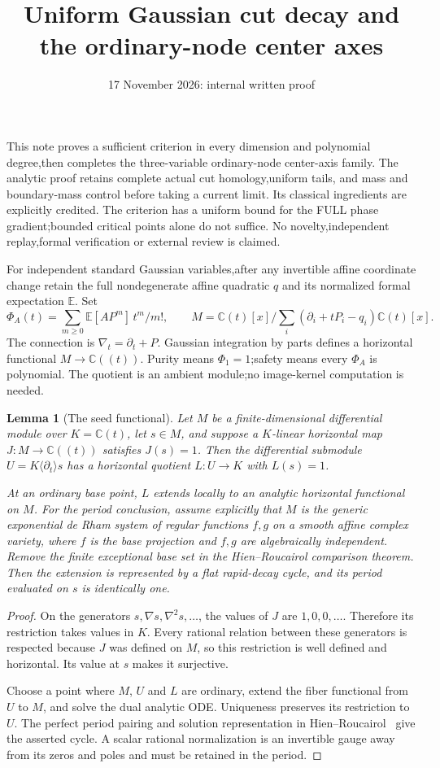 \documentclass[11pt]{article}
\title{Uniform Gaussian cut decay and the ordinary-node center axes}
\author{}\date{17 November 2026: internal written proof}
\newtheorem{lemma}[theorem]{Lemma}
\theoremstyle{definition}\newtheorem{definition}[theorem]{Definition}
\theoremstyle{remark}\newtheorem{remark}[theorem]{Remark}
\newcommand{\C}{\mathbb C}
\begin{document}
\maketitle
This note proves a sufficient criterion in every dimension and polynomial
degree,then completes the three-variable ordinary-node center-axis family.
The analytic proof retains complete actual cut homology,uniform tails,
and mass and boundary-mass control before taking a current limit. Its
classical ingredients are explicitly credited. The criterion has a
uniform bound for the FULL phase gradient;bounded critical points alone
do not suffice. No novelty,independent replay,formal verification or
external review is claimed.

For independent standard Gaussian variables,after any invertible affine
coordinate change retain the full nondegenerate affine quadratic $q$ and
its normalized formal expectation $\mathbb E$. Set
\[
 \Phi_A(t)=\sum_{m\ge0}\mathbb E[AP^m]\,t^m/m!,\qquad
 M=\mathbb C(t)[x]/\sum_i(\partial_i+tP_i-q_i)\mathbb C(t)[x].
\]
The connection is $\nabla_t=\partial_t+P$. Gaussian integration by
parts defines a horizontal functional $M\to\mathbb C((t))$.
Purity means $\Phi_1=1$;safety means every $\Phi_A$ is polynomial.
The quotient is an ambient module;no image-kernel computation is needed.
\begin{lemma}[The seed functional]\label{lem:seedfunctional}
Let $M$ be a finite-dimensional differential module over $K=\C(t)$,
let $s\in M$, and suppose a $K$-linear horizontal map
$J:M\longrightarrow\C((t))$ satisfies $J(s)=1$. Then the differential
submodule $U=K\langle\partial_t\rangle s$ has a horizontal quotient
$L:U\longrightarrow K$ with $L(s)=1$.

At an ordinary base point, $L$ extends locally to an analytic horizontal
functional on $M$. For the period conclusion, assume explicitly that
$M$ is the generic exponential de Rham system of regular functions
$f,g$ on a smooth affine complex variety, where $f$ is the base
projection and $f,g$ are algebraically independent. Remove the finite
exceptional base set in the Hien--Roucairol comparison theorem.
Then the extension is represented by a flat rapid-decay cycle, and its
period evaluated on $s$ is identically one.
\end{lemma}
\begin{proof}
On the generators $s,\nabla s,\nabla^2s,\ldots$, the values of $J$
are $1,0,0,\ldots$. Therefore its restriction takes values in $K$.
Every rational relation between these generators is respected because
$J$ was defined on $M$, so this restriction is well defined and
horizontal. Its value at $s$ makes it surjective.

Choose a point where $M$, $U$ and $L$ are ordinary, extend the fiber
functional from $U$ to $M$, and solve the dual analytic ODE.
Uniqueness preserves its restriction to $U$. The perfect period
pairing and solution representation in
Hien--Roucairol~\cite[Theorems~2.4 and~3.7]{HienRoucairol} give the
asserted cycle. A scalar rational normalization is an invertible gauge
away from its zeros and poles and must be retained in the period.
\end{proof}
\end{document}

